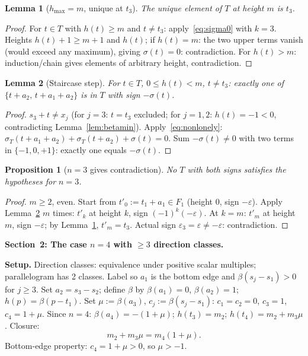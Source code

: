 \documentclass{article}
\newtheorem{lemma}{Lemma}
\newtheorem{prop}{Proposition}
\begin{document}
\begin{lemma}[$h_{\max}=m$, unique at $t_3$]\label{lem:betamax}
The unique element of $T$ at height $m$ is $t_3$.
\end{lemma}
\begin{proof}
For $t\in T$ with $h(t)\ge m$ and $t\ne t_3$: apply~\eqref{eq:sigma0} with $k=3$.
Heights $h(t)+1\ge m+1$ and $h(t)$; if $h(t)=m$: the two upper terms vanish (would exceed any maximum), giving $\sigma(t)=0$: contradiction.
For $h(t)>m$: induction/chain gives elements of arbitrary height, contradiction.
\end{proof}

\begin{lemma}[Staircase step]\label{lem:step}
For $t\in T$, $0\le h(t)<m$, $t\ne t_3$:
exactly one of $\{t+a_2,\,t+a_1+a_2\}$ is in $T$ with sign $-\sigma(t)$.
\end{lemma}
\begin{proof}
$s_3+t\ne x_j$ (for $j=3$: $t=t_3$ excluded; for $j=1,2$: $h(t)=-1<0$, contradicting Lemma~\ref{lem:betamin}).
Apply~\eqref{eq:nonlonely}: $\sigma_T(t+a_1+a_2)+\sigma_T(t+a_2)+\sigma(t)=0$.
Sum $-\sigma(t)\ne 0$ with two terms in $\{-1,0,+1\}$: exactly one equals $-\sigma(t)$.
\end{proof}

\begin{prop}[$n=3$ gives contradiction]\label{prop:n3}
No $T$ with both signs satisfies the hypotheses for $n=3$.
\end{prop}
\begin{proof}
$m\ge 2$, even.  Start from $t'_0:=t_1+a_1\in F_1$ (height $0$, sign $-\varepsilon$).
Apply Lemma~\ref{lem:step} $m$ times: $t'_k$ at height $k$, sign $(-1)^k(-\varepsilon)$.
At $k=m$: $t'_m$ at height $m$, sign $-\varepsilon$; by Lemma~\ref{lem:betamax}, $t'_m=t_3$.
Actual sign $\varepsilon_3=\varepsilon\ne-\varepsilon$: contradiction.
\end{proof}

\bigskip
\noindent\textbf{Section~2: The case $n=4$ with $\ge 3$ direction classes.}

\medskip
\noindent\textbf{Setup.}
Direction classes: equivalence under positive scalar multiples; parallelogram has 2 classes.
Label so $a_1$ is the bottom edge and $\beta(s_j-s_1)>0$ for $j\ge 3$.
Set $a_2=s_3-s_2$; define $\beta$ by $\beta(a_1)=0$, $\beta(a_2)=1$; $h(p)=\beta(p-t_1)$.
Set $\mu:=\beta(a_3)$, $c_j:=\beta(s_j-s_1)$: $c_1=c_2=0$, $c_3=1$, $c_4=1+\mu$.
Since $n=4$: $\beta(a_4)=-(1+\mu)$; $h(t_3)=m_2$; $h(t_4)=m_2+m_3\mu$.
Closure:
\begin{equation}\label{eq:closure4}
  m_2+m_3\mu = m_4(1+\mu).
\end{equation}
Bottom-edge property: $c_4=1+\mu>0$, so $\mu>-1$.
\end{document}

